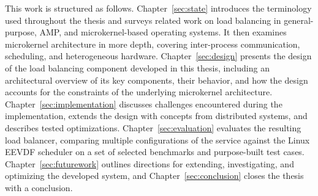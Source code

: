 This work is structured as follows.
Chapter~\ref{sec:state} introduces the terminology used throughout the thesis and surveys related work on load balancing in general-purpose, AMP, and microkernel-based operating systems. It then examines microkernel architecture in more depth, covering inter-process communication, scheduling, and heterogeneous hardware.
Chapter~\ref{sec:design} presents the design of the load balancing component developed in this thesis, including an architectural overview of its key components, their behavior, and how the design accounts for the constraints of the underlying microkernel architecture.
Chapter~\ref{sec:implementation} discusses challenges encountered during the implementation, extends the design with concepts from distributed systems, and describes tested optimizations.
Chapter~\ref{sec:evaluation} evaluates the resulting load balancer, comparing multiple configurations of the service against the Linux EEVDF scheduler on a set of selected benchmarks and purpose-built test cases.
Chapter~\ref{sec:futurework} outlines directions for extending, investigating, and optimizing the developed system, and Chapter~\ref{sec:conclusion} closes the thesis with a conclusion.

\cleardoublepage

